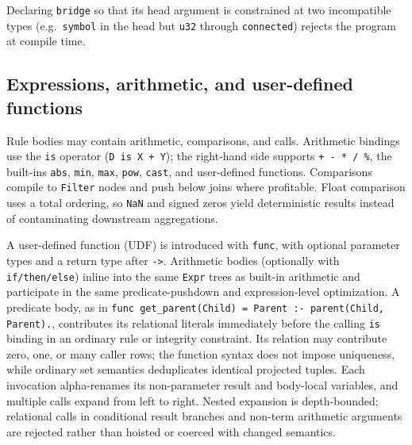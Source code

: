 

Declaring \texttt{bridge} so that its head argument is constrained at two incompatible types (e.g.\ \texttt{symbol} in the head but \texttt{u32} through \texttt{connected}) rejects the program at compile time.

\subsection{Expressions, arithmetic, and user-defined functions}\label{sec:lang:arith}

Rule bodies may contain arithmetic, comparisons, and calls. Arithmetic bindings use the \texttt{is} operator (\texttt{D is X + Y}); the right-hand side supports \texttt{+ - * / \%}, the built-ins \texttt{abs}, \texttt{min}, \texttt{max}, \texttt{pow}, \texttt{cast}, and user-defined functions. Comparisons compile to \texttt{Filter} nodes and push below joins where profitable. Float comparison uses a total ordering, so \texttt{NaN} and signed zeros yield deterministic results instead of contaminating downstream aggregations.



A user-defined function (UDF) is introduced with \texttt{func}, with optional parameter types and a return type after \texttt{->}. Arithmetic bodies (optionally with \texttt{if/then/else}) inline into the same \texttt{Expr} trees as built-in arithmetic and participate in the same predicate-pushdown and expression-level optimization. A predicate body, as in \texttt{func get\_parent(Child) = Parent :- parent(Child, Parent).}, contributes its relational literals immediately before the calling \texttt{is} binding in an ordinary rule or integrity constraint. Its relation may contribute zero, one, or many caller rows; the function syntax does not impose uniqueness, while ordinary set semantics deduplicates identical projected tuples. Each invocation alpha-renames its non-parameter result and body-local variables, and multiple calls expand from left to right. Nested expansion is depth-bounded; relational calls in conditional result branches and non-term arithmetic arguments are rejected rather than hoisted or coerced with changed semantics.

